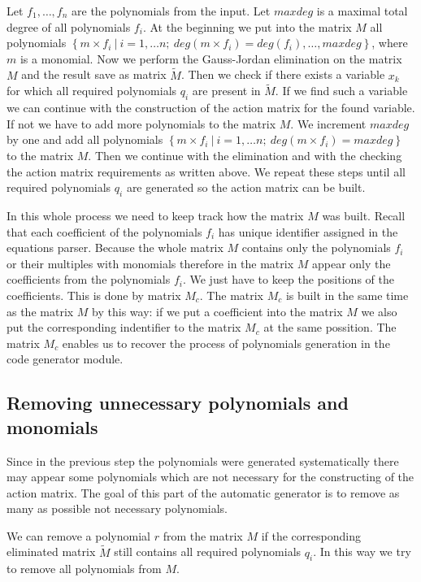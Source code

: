 Let $f_1, \dots, f_n$ are the polynomials from the input. Let $maxdeg$ is a maximal total degree of all polynomials $f_i$. At the beginning we put into the matrix $M$ all polynomials $\left\{m\times f_i\ |\ i = 1,\dots n;\ deg(m\times f_i) = deg(f_i),\dots, maxdeg\right\}$, where $m$ is a monomial. Now we perform the Gauss-Jordan elimination on the matrix $M$ and the result save as matrix $\tilde{M}$. Then we check if there exists a variable $x_k$ for which all required polynomials $q_i$ are present in $\tilde{M}$. If we find such a variable we can continue with the construction of the action matrix for the found variable. If not we have to add more polynomials to the matrix $M$. We increment $maxdeg$ by one and add all polynomials $\left\{m\times f_i\ |\ i = 1,\dots n;\ deg(m\times f_i) = maxdeg\right\}$ to the matrix $M$. Then we continue with the elimination and with the checking the action matrix requirements as written above. We repeat these steps until all required polynomials $q_i$ are generated so the action matrix can be built.

In this whole process we need to keep track how the matrix $M$ was built. Recall that each coefficient of the polynomials $f_i$ has unique identifier assigned in the equations parser. Because the whole matrix $M$ contains only the polynomials $f_i$ or their multiples with monomials therefore in the matrix $M$ appear only the coefficients from the polynomials $f_i$. We just have to keep the positions of the coefficients. This is done by matrix $M_c$. The matrix $M_c$ is built in the same time as the matrix $M$ by this way: if we put a coefficient into the matrix $M$ we also put the corresponding indentifier to the matrix $M_c$ at the same possition. The matrix $M_c$ enables us to recover the process of polynomials generation in the code generator module.

\subsection{Removing unnecessary polynomials and monomials}
Since in the previous step the polynomials were generated systematically there may appear some polynomials which are not necessary for the constructing of the action matrix. The goal of this part of the automatic generator is to remove as many as possible not necessary polynomials.

We can remove a polynomial $r$ from the matrix $M$ if the corresponding eliminated matrix $\tilde{M}$ still contains all required polynomials $q_i$. In this way we try to remove all polynomials from $M$.

